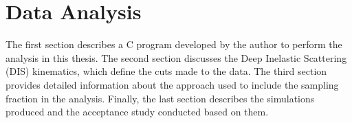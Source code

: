 \section{Data Analysis}
\label{sec::data_analysis}
    The first section describes a C program developed by the author to perform the analysis in this thesis.
    The second section discusses the Deep Inelastic Scattering (DIS) kinematics, which define the cuts made to the data.
    The third section provides detailed information about the approach used to include the sampling fraction in the analysis.
    Finally, the last section describes the simulations produced and the acceptance study conducted based on them.

    
    
    
    
